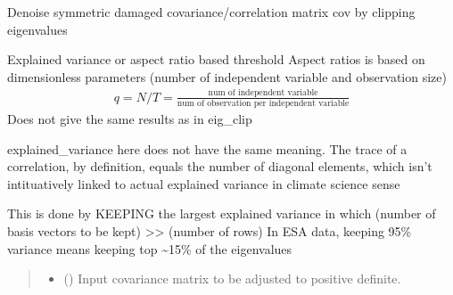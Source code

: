 \documentclass[letterpaper,10pt,english]{sphinxmanual}
\begin{document}

\begin{fulllineitems}
\label{\detokenize{misc:glomar_gridding.covariance_tools.eigenvalue_clip}}
\pysigstartsignatures
\pysiglinewithargsret
{}
{\sphinxparamcomma {}\sphinxparamcomma {}}
{}
\pysigstopsignatures
\sphinxAtStartPar
Denoise symmetric damaged covariance/correlation matrix cov by clipping
eigenvalues

\sphinxAtStartPar
Explained variance or aspect ratio based threshold
Aspect ratios is based on dimensionless parameters
(number of independent variable and observation size)
\begin{equation*}
\begin{split}q = N/T = \frac{\text{num of independent variable}}{\text{num of
                                  observation per independent variable}}\end{split}
\end{equation*}
\sphinxAtStartPar
Does not give the same results as in eig\_clip

\sphinxAtStartPar
explained\_variance here does not have the same meaning.
The trace of a correlation, by definition, equals the number of diagonal
elements, which isn’t intituatively linked to actual explained variance
in climate science sense

\sphinxAtStartPar
This is done by KEEPING the largest explained variance
in which (number of basis vectors to be kept) \textgreater{}\textgreater{} (number of rows)
In ESA data, keeping 95\% variance means keeping top \textasciitilde{}15\% of the
eigenvalues
\begin{quote}\begin{description}
\begin{itemize}
\item {}
\sphinxAtStartPar
{} () \textendash{} Input covariance matrix to be adjusted to positive definite.


\end{itemize}
\end{description}
\end{quote}
\end{fulllineitems}
\end{document}
